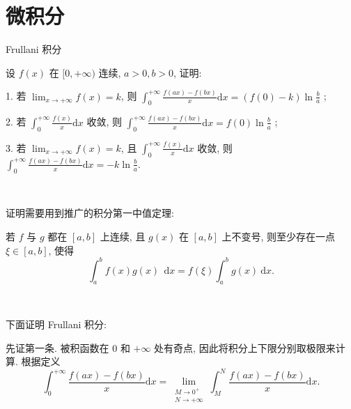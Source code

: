 \chapter{微积分}

\noindent Frullani 积分

设 $f(x)$ 在 $[0,+\infty)$ 连续, $a>0, b>0$, 证明:

1. 若 $\displaystyle \lim_{x \to +\infty} f(x) = k$, 则 $\displaystyle \int_0^{+\infty}\frac{f(ax)-f(bx)}{x}\mathrm{d}x = \left(f(0) - k\right)\ln\frac{b}{a}$ ;

2. 若 $\displaystyle \int_0^{+\infty}\frac{f(x)}{x}\mathrm{d}x$ 收敛, 则 $\displaystyle \int_0^{+\infty}\frac{f(ax)-f(bx)}{x}\mathrm{d}x = f(0)\ln\frac{b}{a}$ ;

3. 若 $\displaystyle \lim_{x \to +\infty} f(x) = k$, 且 $\displaystyle \int_0^{+\infty}\frac{f(x)}{x}\mathrm{d}x$ 收敛, 则 $\displaystyle \int_0^{+\infty}\frac{f(ax)-f(bx)}{x}\mathrm{d}x = -k\ln\frac{b}{a}$.

~

\noindent 证明需要用到推广的积分第一中值定理:

若 $f$ 与 $g$ 都在 $[a,b]$ 上连续, 且 $g(x)$ 在 $[a,b]$ 上不变号, 则至少存在一点 $\xi\in[a,b]$, 使得
\[\int_a^b f(x)g(x)\ \ \mathrm{d}x = f(\xi)\int_a^b g(x)\ \mathrm{d}x .\]

~

\noindent 下面证明 Frullani 积分: 

先证第一条. 被积函数在 $0$ 和 $+\infty$ 处有奇点, 因此将积分上下限分别取极限来计算. 根据定义
\[\int_0^{+\infty}\frac{f(ax)-f(bx)}{x}\mathrm{d}x = \lim_{\substack{M\to 0^+ \\ N\to +\infty}}\int_M^N\frac{f(ax)-f(bx)}{x}\mathrm{d}x .\]

